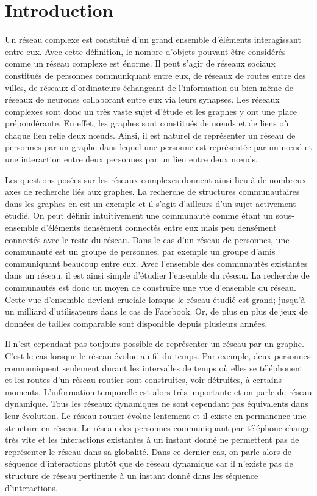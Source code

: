 
\chapter*{Introduction}

Un réseau complexe est constitué d'un grand ensemble d'éléments interagissant entre eux.
Avec cette définition, le nombre d'objets pouvant être considérés comme un réseau complexe est énorme.
Il peut s'agir de réseaux sociaux constitués de personnes communiquant entre eux, de réseaux de routes entre des villes, de réseaux d'ordinateurs échangeant de l'information ou bien même de réseaux de neurones collaborant entre eux via leurs synapses.
Les réseaux complexes sont donc un très vaste sujet d'étude et les graphes y ont une place prépondérante.
En effet, les graphes sont constitués de n\oe uds et de liens où chaque lien relie deux n\oe uds.
Ainsi, il est naturel de représenter un réseau de personnes par un graphe dans lequel une personne est représentée par un n\oe ud et une interaction entre deux personnes par un lien entre deux n\oe uds.

Les questions posées sur les réseaux complexes donnent ainsi lieu à de nombreux axes de recherche liés aux graphes.
La recherche de structures communautaires dans les graphes en est un exemple et il s'agit d'ailleurs d'un sujet activement étudié.
On peut définir intuitivement une communauté comme étant un sous-ensemble d’éléments densément connectés entre eux mais peu densément connectés avec le reste du réseau.
Dans le cas d'un réseau de personnes, une communauté est un groupe de personnes, par exemple un groupe d'amis communiquant beaucoup entre eux.
Avec l'ensemble des communautés existantes dans un réseau, il est ainsi simple d'étudier l'ensemble du réseau.
La recherche de communautés est donc un moyen de construire une vue d'ensemble du réseau.
Cette vue d'ensemble devient cruciale lorsque le réseau étudié est grand; jusqu'à un milliard d'utilisateurs dans le cas de Facebook.
Or, de plus en plus de jeux de données de tailles comparable sont disponible depuis plusieurs années.


Il n'est cependant pas toujours possible de représenter un réseau par un graphe.
C'est le cas lorsque le réseau évolue au fil du temps.
Par exemple, deux personnes communiquent seulement durant les intervalles de temps où elles se téléphonent et les routes d'un réseau routier sont construites, voir détruites, à certains moments.
L'information temporelle est alors très importante et on parle de réseau dynamique.
Tous les réseaux dynamiques ne sont cependant pas équivalents dans leur évolution.
Le réseau routier évolue lentement et il existe en permanence une structure en réseau.
Le réseau des personnes communiquant par téléphone change très vite et les interactions existantes à un instant donné ne permettent pas de représenter le réseau dans sa globalité.
Dans ce dernier cas, on parle alors de séquence d'interactions plutôt que de réseau dynamique car il n'existe pas de structure de réseau pertinente à un instant donné dans les séquence d'interactions.


